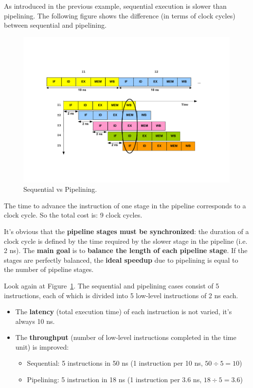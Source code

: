 \documentclass[a4paper]{article}
\newcommand{\highspace}{\vspace{1.2em}\noindent}
\begin{document}
    \noindent
    As introduced in the previous example, sequential execution is slower than pipelining. The following figure shows the difference (in terms of clock cycles) between sequential and pipelining.
    \begin{figure}[!htp]
        \centering
        \includegraphics[width=\textwidth]{img/sequential-vs-pipelining-1.pdf}
        \caption{Sequential vs Pipelining.\cite{pipelining-slides}}
        \label{fig: sequential vs pipelining}
    \end{figure}
    
    \newpage

    \noindent
    The time to advance the instruction of one stage in the pipeline corresponds to a clock cycle. So the total cost is: 9 clock cycles.

    \highspace
    It's obvious that the \textbf{pipeline stages must be synchronized}: the duration of a clock cycle is defined by the time required by the slower stage in the pipeline (i.e. 2 ns). The \textbf{main goal} is to \textbf{balance the length of each pipeline stage}. If the stages are perfectly balanced, the \textbf{ideal speedup} due to pipelining is equal to the number of pipeline stages.

    \highspace
    Look again at Figure~\ref{fig: sequential vs pipelining}. The sequential and pipelining cases consist of 5 instructions, each of which is divided into 5 low-level instructions of 2 ns each.
    \begin{itemize}
        \item The \textbf{latency} (total execution time) of each instruction is not varied, it's always 10 ns.

        \item The \textbf{throughput} (number of low-level instructions completed in the time unit) is improved:
        \begin{itemize}
            \item Sequential: 5 instructions in 50 ns (1 instruction per 10 ns, $50 \div 5 = 10$)
            \item Pipelining: 5 instruction in 18 ns (1 instruction per 3.6 ns, $18 \div 5 = 3.6$)
        \end{itemize}
    \end{itemize}
\end{document}
